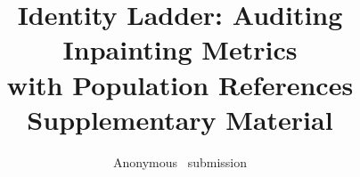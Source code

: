 \documentclass[10pt,twocolumn,letterpaper]{article}
\title{Identity Ladder: Auditing Inpainting Metrics\\
with Population References\\Supplementary Material}
\author{Anonymous \confName~submission}
\begin{document}
\onecolumn
\maketitle
\renewcommand{\thesection}{S\arabic{section}}
\renewcommand{\thefigure}{S\arabic{figure}}
\renewcommand{\thetable}{S\arabic{table}}

{\small}
\end{document}
